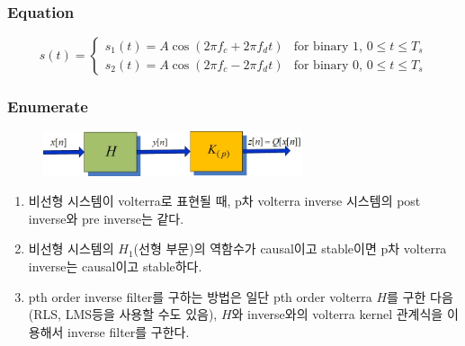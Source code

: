 \documentclass{beamer}
\begin{document}
\begin{frame}
\frametitle{Equation}

\begin{equation} \label{eq:ble-fsk}
  s(t) = \left\{
     \begin{array}{lr}
       s_1(t) = A \cos(2 \pi f_c + 2 \pi f_d t) & \text{for binary 1, } 0 \leq t \leq T_s \\
       s_2(t)= A \cos(2 \pi f_c - 2 \pi f_d t) & \text{for binary 0, } 0 \leq t \leq T_s 
    \end{array} \right.  %
\end{equation}

\end{frame}

\begin{frame}
\frametitle{Enumerate}

\begin{figure}[h]
\centering  \includegraphics[width=3in]{Figures/volterra.jpg}
\end{figure}


  \begin{enumerate}
    \item 비선형 시스템이 volterra로 표현될 때, p차 volterra inverse 시스템의 post inverse와 pre inverse는 같다.
  \item 비선형 시스템의 $H_1$(선형 부문)의 역함수가 causal이고 stable이면 p차 volterra inverse는 causal이고 stable하다.
   \item pth order inverse filter를 구하는 방법은 일단 pth order volterra $H$를 구한 다음(RLS, LMS등을 사용할 수도 있음),
   $H$와 inverse와의 volterra kernel 관계식을 이용해서 inverse filter를 구한다.

  \end{enumerate}

\end{frame}
\end{document}
